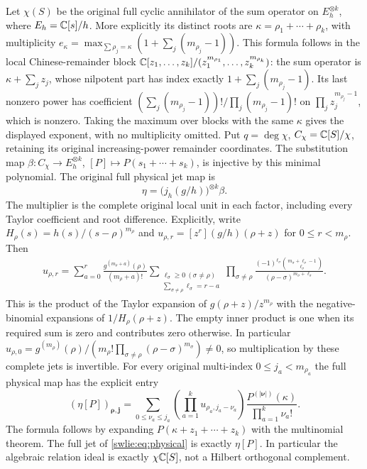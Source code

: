 Let $\chi(S)$ be the original full cyclic annihilator of
the sum operator on $E_h^{\otimes k}$, where
$E_h=\mathbb C[s]/h$. More explicitly its distinct roots are
$\kappa=\rho_1+\cdots+\rho_k$, with multiplicity
$e_\kappa=\max_{\sum\rho_j=\kappa}(1+\sum_j(m_{\rho_j}-1))$.
This formula follows in the local Chinese-remainder block
$\mathbb C[z_1,\ldots,z_k]/(z_1^{m_{\rho_1}},\ldots,z_k^{m_{\rho_k}})$:
the sum operator is $\kappa+\sum_jz_j$,
whose nilpotent part has index exactly
$1+\sum_j(m_{\rho_j}-1)$. Its last nonzero power has
coefficient
$(\sum_j(m_{\rho_j}-1))!/\prod_j(m_{\rho_j}-1)!$
on $\prod_jz_j^{m_{\rho_j}-1}$, which is nonzero.
Taking the maximum over blocks with the same $\kappa$
gives the displayed exponent, with no multiplicity omitted.
Put $q=\deg\chi$, $C_\chi=\mathbb C[S]/\chi$, retaining its
original increasing-power remainder coordinates.
The substitution map
$\beta:C_\chi\to E_h^{\otimes k}$,
$[P]\mapsto P(s_1+\cdots+s_k)$, is injective by this
minimal polynomial. The original full physical jet map is
\begin{equation}\label{swlie:eq:unitreceiver}
 \eta=\bigl(j_h(g/h)\bigr)^{\otimes k}\beta.
\end{equation}
The multiplier is the complete original local unit in
each factor, including every Taylor coefficient and
root difference. Explicitly, write $H_\rho(s)=h(s)/(s-\rho)^{m_\rho}$
and $u_{\rho,r}=[z^r](g/h)(\rho+z)$ for $0\leq r<m_\rho$.
Then
\begin{equation}\label{swlie:eq:unitcoefficients}
 \begin{split}
 u_{\rho,r}
 =\sum_{a=0}^r\frac{g^{(m_\rho+a)}(\rho)}{(m_\rho+a)!}
 \sum_{\substack{\ell_\sigma\geq0\ (\sigma\ne\rho)\\
                 \sum_{\sigma\ne\rho}\ell_\sigma=r-a}}
 \prod_{\sigma\ne\rho}
 \frac{(-1)^{\ell_\sigma}
       \binom{m_\sigma+\ell_\sigma-1}{\ell_\sigma}}
      {(\rho-\sigma)^{m_\sigma+\ell_\sigma}} .
 \end{split}
\end{equation}
This is the product of the Taylor expansion of
$g(\rho+z)/z^{m_\rho}$ with the negative-binomial
expansions of $1/H_\rho(\rho+z)$.
The empty inner product is one when its required sum is
zero and contributes zero otherwise.
In particular
$u_{\rho,0}=g^{(m_\rho)}(\rho)/
 (m_\rho!\prod_{\sigma\ne\rho}(\rho-\sigma)^{m_\sigma})\ne0$,
so multiplication by these complete jets is invertible.
For every original multi-index $0\leq j_a<m_{\rho_a}$ the
full physical map has the explicit entry
\begin{equation}\label{swlie:eq:etajets}
 (\eta[P])_{\boldsymbol\rho,\boldsymbol j}
 =\sum_{0\leq\nu_a\leq j_a}
     \left(\prod_{a=1}^k u_{\rho_a,j_a-\nu_a}\right)
          \frac{P^{(|\boldsymbol\nu|)}(\kappa)}
               {\prod_{a=1}^k\nu_a!}.
\end{equation}
The formula follows by expanding
$P(\kappa+z_1+\cdots+z_k)$ with the multinomial theorem.
The full jet of \eqref{swlie:eq:physical}
is exactly $\eta[P]$. In particular the algebraic
relation ideal is exactly $\chi\mathbb C[S]$, not a
Hilbert orthogonal complement.

